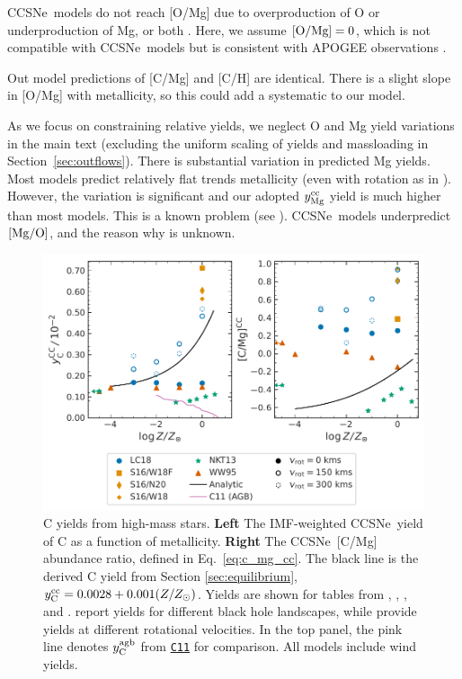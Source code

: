 \documentclass[fleqn,usenatbib]{mnras}
\newcommand{\cxi}{\texttt{\hyperlink{C11}{C11}}}
\newcommand{\cc}{CCSNe}
\newcommand{\imf}{IMF}
\newcommand{\apogee}{APOGEE}
\newcommand{\Ycc}{\ensuremath{y_{\rm C}^{\rm cc}}}
\newcommand{\Yoc}{\ensuremath{y_{\rm Mg}^{\rm cc}}}
\newcommand{\Ycagb}{\ensuremath{y_{\rm C}^{\rm agb}}}
\begin{document}
\cc\ models do not reach [O/Mg] due to overproduction of O or underproduction of Mg, or both \citep{emily+21}. Here, we assume ${\rm [O/Mg]} = 0$, which is not compatible with \cc\ models but is consistent with \apogee{} observations \citep{weinberg+19, weinberg+22}.

Out model predictions of [C/Mg] and [C/H] are identical. There is a slight slope in [O/Mg] with metallicity, so this could add a systematic to our model.

As we focus on constraining relative yields, we neglect O and Mg yield variations in the main text (excluding the uniform scaling of yields and massloading in Section~\ref{sec:outflows}). There is substantial variation in predicted Mg yields. Most models predict relatively flat trends metallicity (even with rotation as in \citealt{LC18}). However, the variation is significant and our adopted $\Yoc$ yield is much higher than most models. This is a known problem (see \citealt{emily+21}). \cc\ models underpredict $[{\rm Mg}/{\rm O}]$, and the reason why is unknown. 
    

\begin{figure}
    \centering
    \includegraphics{cc_yields.pdf}
    \caption[High-Mass Star Carbon Yields]{
        C yields from high-mass stars.
        \textbf{Left} The \imf-weighted \cc\ yield of C as a function of metallicity.
        \textbf{Right} The \cc\ [C/Mg] abundance ratio, defined in Eq.~\ref{eq:c_mg_cc}. The black line is the derived C yield from Section \ref{sec:equilibrium},
    $\Ycc = 0.0028 + 0.001 (Z/Z_{\odot})$. Yields are shown for tables from 
    \citet[red triangles]{WW95}, \citet[orange squares and diamonds]{sukhbold+16}, 
    \citet[green stars]{NKT13}, and \citet[blue circles]{LC18}. \citet{sukhbold+16} report yields for different black hole landscapes, while \citet{LC18} provide yields at different rotational velocities.
    In the top panel, the pink line denotes $\Ycagb$ from \cxi{} for comparison. All models include wind yields.
}
    \label{fig:y_cc}
\end{figure}
\end{document}

